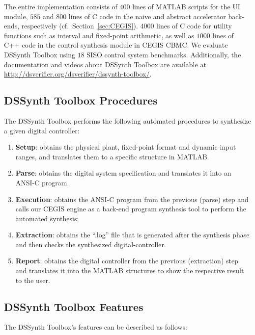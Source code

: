 \documentclass[10pt,conference]{IEEEtran}
\newcommand\tool{{DSSynth Toolbox}\xspace}
\begin{document}
The entire implementation consists of $400$ lines of MATLAB scripts for the
UI module, $585$ and $800$ lines of C code in the naive and abstract
accelerator back-ends, respectively (cf.~Section~\ref{sec:CEGIS}).  $4000$
lines of C code for utility functions such as interval and fixed-point
arithmetic, as well as $1000$ lines of C++ code in the control synthesis
module in CEGIS CBMC.  We evaluate \tool using $18$ SISO control system
benchmarks.  Additionally, the documentation and videos about \tool are
available at \url{http://dsverifier.org/dsverifier/dssynth-toolbox/}.


\subsection{\tool Procedures}

The \tool performs the following automated procedures 
to synthesize a given digital controller:

\begin{enumerate}
\item \textbf{Setup}: obtains the physical plant, fixed-point format 
and dynamic input ranges, and translates them to a specific structure in MATLAB.
\item \textbf{Parse}: obtains the digital system specification and translates 
it into an ANSI-C program.
\item \textbf{Execution}: obtains the ANSI-C program from the previous (parse) step 
and calls our CEGIS engine as a back-end program synthesis tool to perform the automated synthesis;
\item \textbf{Extraction}: obtains the ``.log'' file that is generated 
after the synthesis phase and then checks the synthesized digital-controller.
\item \textbf{Report}: obtains the digital controller from the previous (extraction) step 
and translates it into the MATLAB structures to show the respective result to the user.
\end{enumerate}

\subsection{\tool Features}

The \tool's features can be described as follows:
\end{document}
